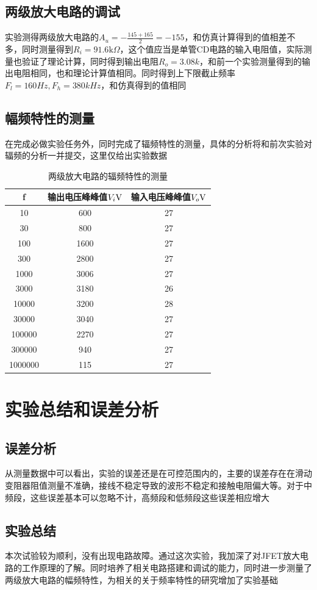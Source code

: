 \documentclass[UTF8,a4paper]{ctexart}
\begin{document}
\subsection{两级放大电路的调试}
实验测得两级放大电路的$A_u=-\frac{145+165}{2}=-155$，和仿真计算得到的值相差不多，同时测量得到$R_i=91.6\mathrm{k}\Omega$，这个值应当是单管CD电路的输入电阻值，实际测量也验证了理论计算，同时得到输出电阻$R_o=3.08k$，和前一个实验测量得到的输出电阻相同，也和理论计算值相同。同时得到上下限截止频率$F_l=160Hz,F_h=380kHz$，和仿真得到的值相同
\subsection{幅频特性的测量}
在完成必做实验任务外，同时完成了辐频特性的测量，具体的分析将和前次实验对辐频的分析一并提交，这里仅给出实验数据
\begin{table}
\caption{两级放大电路的辐频特性的测量}
\begin{tabular}{|c|c|c|}
\hline
f&输出电压峰峰值$V_i\rm{V}$&输入电压峰峰值$V_o\rm{V}$ \\
\hline
10&600&27\\
\hline
30&800&27\\
\hline
100&1600&27\\
\hline
300&2800&27\\
\hline
1000&3006&27\\
\hline
3000&3180&26\\
\hline
10000&3200&28\\
\hline
30000&3040&27\\
\hline
100000&2270&27\\
\hline
300000&940&27\\
\hline
1000000&115&27\\
\hline
\end{tabular}
\end{table}
\section{实验总结和误差分析}
\subsection{误差分析}
从测量数据中可以看出，实验的误差还是在可控范围内的，主要的误差存在在滑动变阻器阻值测量不准确，接线不稳定导致的波形不稳定和接触电阻偏大等。对于中频段，这些误差基本可以忽略不计，高频段和低频段这些误差相应增大
\subsection{实验总结}
本次试验较为顺利，没有出现电路故障。通过这次实验，我加深了对JFET放大电路的工作原理的了解。同时培养了相关电路搭建和调试的能力，同时进一步测量了两级放大电路的幅频特性，为相关的关于频率特性的研究增加了实验基础
\end{document}
